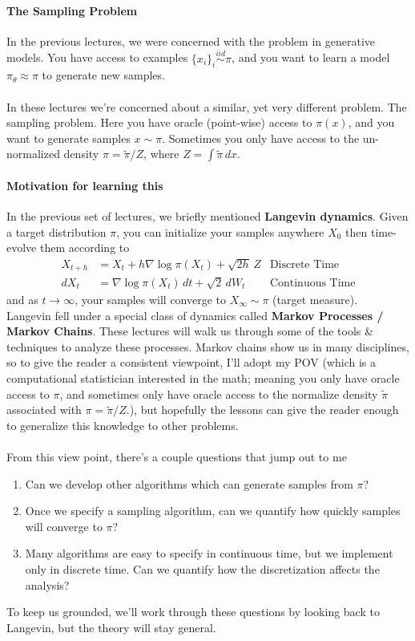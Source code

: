 \paragraph{The Sampling Problem}
In the previous lectures, we were concerned with the problem in generative models. You have access to examples $\{x_i\}_i \overset{iid}{\sim} \pi$, and you want to learn a model $\pi_\theta \approx \pi$ to generate new samples.\\
\\
In these lectures we're concerned about a similar, yet very different problem. The sampling problem. Here you have oracle (point-wise) access to $\pi(x)$, and you want to generate samples $x \sim \pi$. Sometimes you only have access to the un-normalized density $\pi = \tilde \pi / Z$, where $Z = \int \tilde \pi \, dx$.

\paragraph{Motivation for learning this}
In the previous set of lectures, we briefly mentioned \textbf{Langevin dynamics}. Given a target distribution $\pi$, you can initialize your samples anywhere $X_0$ then time-evolve them according to
\begin{align}
	X_{t+h} & = X_t + h \nabla \log \pi(X_t)  + \sqrt{2h} \, Z & \text{Discrete Time}\\
	dX_t & = \nabla \log \pi(X_t) \, dt + \sqrt 2 \, dW_t & \text{Continuous Time}
\end{align}
and as $t \to \infty$, your samples will converge to $X_\infty \sim \pi$ (target measure). 
\\

Langevin fell under a special class of dynamics called \textbf{Markov Processes / Markov Chains}. These lectures will walk us through some of the tools \& techniques to analyze these processes. Markov chains show us in many disciplines, so to give the reader a consistent viewpoint, I'll adopt my POV (which is a computational statistician interested in the math; meaning you only have oracle access to $\pi$, and sometimes only have oracle access to the normalize density $\tilde \pi$ associated with $\pi = \tilde \pi / Z$.), but hopefully the lessons can give the reader enough to generalize this knowledge to other problems.  
\\
\\
From this view point, there's a couple questions that jump out to me
\begin{enumerate}
	\item Can we develop other algorithms which can generate samples from $\pi$?
	\item Once we specify a sampling algorithm, can we quantify how quickly samples will converge to $\pi$?
	\item Many algorithms are easy to specify in continuous time, but we implement only in discrete time. Can we quantify how the discretization affects the analysis?
\end{enumerate}
To keep us grounded, we'll work through these questions by looking back to Langevin, but the theory will stay general.


